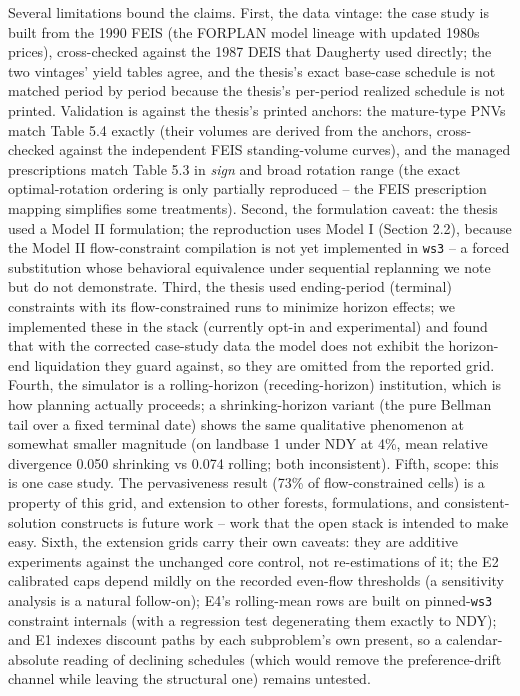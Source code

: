 Several limitations bound the claims. First, the data vintage: the case study is built from the 1990 FEIS (the FORPLAN model lineage with updated 1980s prices), cross-checked against the 1987 DEIS that Daugherty used directly; the two vintages' yield tables agree, and the thesis's exact base-case schedule is not matched period by period because the thesis's per-period realized schedule is not printed. Validation is against the thesis's printed anchors: the mature-type PNVs match Table 5.4 exactly (their volumes are derived from the anchors, cross-checked against the independent FEIS standing-volume curves), and the managed prescriptions match Table 5.3 in \emph{sign} and broad rotation range (the exact optimal-rotation ordering is only partially reproduced -- the FEIS prescription mapping simplifies some treatments). Second, the formulation caveat: the thesis used a Model II formulation; the reproduction uses Model I (Section 2.2), because the Model II flow-constraint compilation is not yet implemented in \texttt{ws3} -- a forced substitution whose behavioral equivalence under sequential replanning we note but do not demonstrate. Third, the thesis used ending-period (terminal) constraints with its flow-constrained runs to minimize horizon effects; we implemented these in the stack (currently opt-in and experimental) and found that with the corrected case-study data the model does not exhibit the horizon-end liquidation they guard against, so they are omitted from the reported grid. Fourth, the simulator is a rolling-horizon (receding-horizon) institution, which is how planning actually proceeds; a shrinking-horizon variant (the pure Bellman tail over a fixed terminal date) shows the same qualitative phenomenon at somewhat smaller magnitude (on landbase 1 under NDY at 4\%, mean relative divergence 0.050 shrinking vs 0.074 rolling; both inconsistent). Fifth, scope: this is one case study. The pervasiveness result (73\% of flow-constrained cells) is a property of this grid, and extension to other forests, formulations, and consistent-solution constructs is future work -- work that the open stack is intended to make easy. Sixth, the extension grids carry their own caveats: they are additive experiments against the unchanged core control, not re-estimations of it; the E2 calibrated caps depend mildly on the recorded even-flow thresholds (a sensitivity analysis is a natural follow-on); E4's rolling-mean rows are built on pinned-\texttt{ws3} constraint internals (with a regression test degenerating them exactly to NDY); and E1 indexes discount paths by each subproblem's own present, so a calendar-absolute reading of declining schedules (which would remove the preference-drift channel while leaving the structural one) remains untested.
